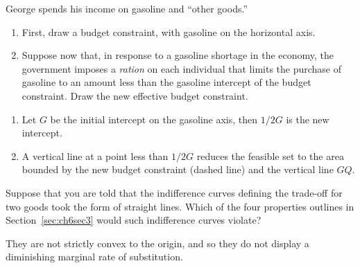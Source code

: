 \begin{enumialphparenastyle}
\begin{econex}\label{ex:ch6ex7}
George spends his income on gasoline and ``other goods.''
\begin{enumerate}
\item	First, draw a budget constraint, with gasoline on the horizontal axis.
\item	Suppose now that, in response to a gasoline shortage in the economy, the government imposes a \textit{ration} on each individual that limits the purchase of gasoline to an amount less than the gasoline intercept of the budget constraint. Draw the new effective budget constraint.
\end{enumerate}
\begin{econsolution}
\begin{enumerate}
\item	Let $G$ be the initial intercept on the gasoline axis, then $1/2G$ is the new intercept.
\item	A vertical line at a point less than $1/2G$ reduces the feasible set to the area bounded by the new budget constraint (dashed line) and the vertical line $GQ$.
\end{enumerate}
\begin{center*}
\end{center*}
\end{econsolution}
\end{econex}

\begin{econex}\label{ex:ch6ex8}
Suppose that you are told that the indifference curves defining the trade-off for two goods took the form of straight lines. Which of the four properties outlines in Section~\ref{sec:ch6sec3} would such indifference curves violate?
\begin{econsolution}
They are not strictly convex to the origin, and so they do not display a diminishing marginal rate of substitution.


\end{econsolution}
\end{econex}
\end{enumialphparenastyle}
